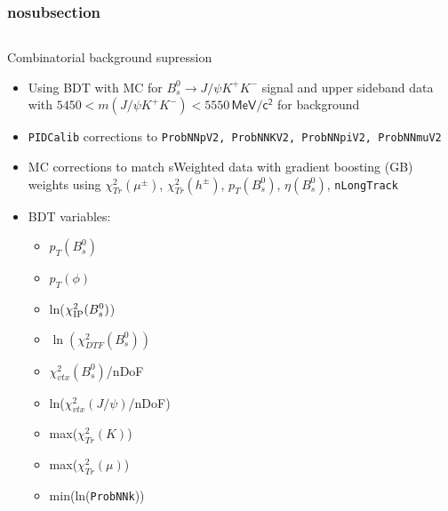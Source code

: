 \documentclass[aspectratio=169,9pt,handout]{beamer}
\begin{document}
\begin{frame}[default] %
\frametitle{nosubsection}

\begin{columns}
  \begin{column}{0.65\textwidth}
    \begin{block}{Combinatorial background supression}
      \begin{itemize}
        \item Using BDT with MC for $B_s^0 \rightarrow J/\psi K^+ K^- $ signal and upper sideband data with
        $5450 < m(J/\psi K^+ K^- )< 5550 \, \mathsf{MeV/c^{2}}$ for background
        \item \texttt{PIDCalib} corrections to \texttt{ProbNNpV2, ProbNNKV2, ProbNNpiV2, ProbNNmuV2}
        \item MC corrections to match sWeighted data with gradient boosting (GB) weights using $\chi^{2}_{Tr}(\mu^{\pm})$, $\chi^{2}_{Tr}(h^{\pm})$, $p_{T}(B_s^0)$, $\eta(B_s^0)$, \texttt{nLongTrack}
        \item BDT variables: \vspace{-5mm} 
        \begin{multicols}{3}  
        \begin{itemize} \footnotesize
          \item $p_{T}(B_s^0)$%
          \item $p_{T}(\phi)$  %
          \item ln($\chi^2_{\rm IP}(B_s^0)$) %
          \item $\ln(\chi^2_{DTF}(B_s^0))$ %
          \item $\chi^2_{vtx}(B_s^0)$/nDoF %
          \item ln($\chi_{vtx}^2(J/\psi)$/nDoF) %
          \item max($\chi_{Tr}^2(K)$) %
          \item max($\chi_{Tr}^2(\mu)$) %
          \item min(ln({\tt ProbNNk})) %

\end{itemize}
\end{multicols}
\end{itemize}
\end{block}
\end{column}
\end{columns}
\end{frame}
\end{document}
